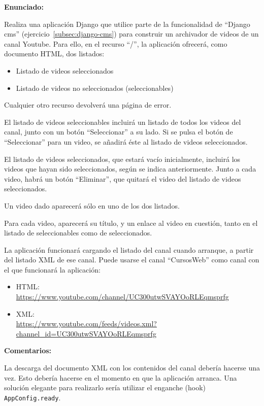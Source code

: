 \textbf{Enunciado:}

Realiza una aplicación Django que utilice parte de la funcionalidad de ``Django cms'' (ejercicio~\ref{subsec:django-cms}) para construir un archivador de videos de un canal Youtube. Para ello, en el recurso ``/'', la aplicación ofrecerá, como documento HTML, dos listados:

\begin{itemize}
\item Listado de videos seleccionados
\item Listado de videos no seleccionados (seleccionables)
\end{itemize}

Cualquier otro recurso devolverá una página de error.

El listado de videos seleccionables incluirá un listado de todos los videos del canal, junto con un botón ``Seleccionar'' a su lado. Si se pulsa el botón de ``Seleccionar'' para un video, se añadirá éste al listado de videos seleccionados.

El listado de videos seleccionados, que estará vacío inicialmente, incluirá los videos que hayan sido seleccionados, según se indica anteriormente. Junto a cada video, habrá un botón ``Eliminar'', que quitará el video del listado de videos seleccionados.

Un video dado aparecerá sólo en uno de los dos listados.

Para cada video, aparecerá su título, y un enlace al video en cuestión, tanto en el listado de seleccionables como de seleccionados.

La aplicación funcionará cargando el listado del canal cuando arranque, a partir del listado XML de ese canal. Puede usarse el canal ``CursosWeb'' como canal con el que funcionará la aplicación:

\begin{itemize}
\item HTML: \\
  \url{https://www.youtube.com/channel/UC300utwSVAYOoRLEqmsprfg}
\item XML: \\
  \url{https://www.youtube.com/feeds/videos.xml?channel_id=UC300utwSVAYOoRLEqmsprfg}
\end{itemize}

\textbf{Comentarios:}

La descarga del documento XML con los contenidos del canal debería hacerse una vez. Esto debería hacerse en el momento en que la aplicación arranca. Una solución elegante para realizarlo sería utilizar el enganche (hook) \verb|AppConfig.ready|.

